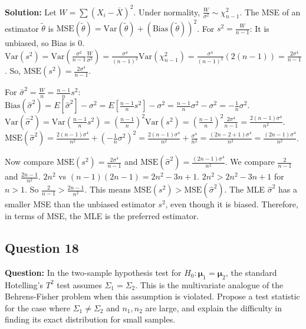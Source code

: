 \textbf{Solution:}
Let $W = \sum(X_i-\bar{X})^2$. Under normality, $\frac{W}{\sigma^2} \sim \chi^2_{n-1}$.
The MSE of an estimator $\tilde{\theta}$ is $\text{MSE}(\tilde{\theta}) = \text{Var}(\tilde{\theta}) + (\text{Bias}(\tilde{\theta}))^2$.
For $s^2 = \frac{W}{n-1}$: It is unbiased, so Bias is 0.
$\text{Var}(s^2) = \text{Var}(\frac{\sigma^2}{n-1} \frac{W}{\sigma^2}) = \frac{\sigma^4}{(n-1)^2} \text{Var}(\chi^2_{n-1}) = \frac{\sigma^4}{(n-1)^2} (2(n-1)) = \frac{2\sigma^4}{n-1}$.
So, $\text{MSE}(s^2) = \frac{2\sigma^4}{n-1}$.

For $\hat{\sigma}^2 = \frac{W}{n} = \frac{n-1}{n}s^2$:
$\text{Bias}(\hat{\sigma}^2) = E[\hat{\sigma}^2] - \sigma^2 = E[\frac{n-1}{n}s^2] - \sigma^2 = \frac{n-1}{n}\sigma^2 - \sigma^2 = -\frac{1}{n}\sigma^2$.
$\text{Var}(\hat{\sigma}^2) = \text{Var}(\frac{n-1}{n}s^2) = (\frac{n-1}{n})^2 \text{Var}(s^2) = (\frac{n-1}{n})^2 \frac{2\sigma^4}{n-1} = \frac{2(n-1)\sigma^4}{n^2}$.
$\text{MSE}(\hat{\sigma}^2) = \frac{2(n-1)\sigma^4}{n^2} + (-\frac{1}{n}\sigma^2)^2 = \frac{2(n-1)\sigma^4}{n^2} + \frac{\sigma^4}{n^2} = \frac{(2n-2+1)\sigma^4}{n^2} = \frac{(2n-1)\sigma^4}{n^2}$.

Now compare $\text{MSE}(s^2) = \frac{2\sigma^4}{n-1}$ and $\text{MSE}(\hat{\sigma}^2) = \frac{(2n-1)\sigma^4}{n^2}$.
We compare $\frac{2}{n-1}$ and $\frac{2n-1}{n^2}$.
$2n^2$ vs $(n-1)(2n-1) = 2n^2 - 3n + 1$.
$2n^2 > 2n^2 - 3n + 1$ for $n>1$.
So $\frac{2}{n-1} > \frac{2n-1}{n^2}$.
This means $\text{MSE}(s^2) > \text{MSE}(\hat{\sigma}^2)$. The MLE $\hat{\sigma}^2$ has a smaller MSE than the unbiased estimator $s^2$, even though it is biased. Therefore, in terms of MSE, the MLE is the preferred estimator.

\subsection*{Question 18}
\textbf{Question:} In the two-sample hypothesis test for $H_0: \boldsymbol{\mu}_1 = \boldsymbol{\mu}_2$, the standard Hotelling's $T^2$ test assumes $\Sigma_1 = \Sigma_2$. This is the multivariate analogue of the Behrens-Fisher problem when this assumption is violated. Propose a test statistic for the case where $\Sigma_1 \neq \Sigma_2$ and $n_1, n_2$ are large, and explain the difficulty in finding its exact distribution for small samples.

